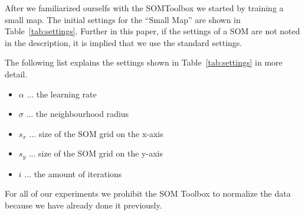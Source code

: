 \documentclass{acm_proc_article-sp}
\begin{document}
After we familiarized ourselfs with the SOMToolbox we started by training a small
map. The initial settings for the ``Small Map'' are shown in Table~\ref{tab:settings}. Further in this paper, if the settings of a SOM are not noted in the description, it is implied that we use the standard settings. 

The following list explains the settings shown in Table~\ref{tab:settings} in more detail.

\begin{itemize}
    \item $\alpha$ ... the learning rate
    \item $\sigma$ ... the neighbourhood radius
    \item $s_x$ ... size of the SOM grid on the x-axis
    \item $s_y$ ... size of the SOM grid on the y-axis
    \item $i$ ... the amount of iterations
\end{itemize}

For all of our experiments we prohibit the SOM Toolbox to normalize the data because we have
already done it previously.
\end{document}
